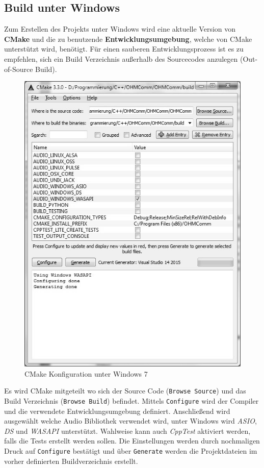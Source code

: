 \subsection{Build unter Windows}
Zum Erstellen des Projekts unter Windows wird eine aktuelle Version von \textbf{CMake} \cite{Cmake} und die zu benutzende \textbf{Entwicklungsumgebung}, welche von CMake unterstützt wird, benötigt.
Für einen sauberen Entwicklungsprozess ist es zu empfehlen, sich ein Build Verzeichnis außerhalb des Sourcecodes anzulegen (Out-of-Source Build).

\begin{figure}[htp]
\centering
\includegraphics[width=.80\textwidth]{images/CMake}
\caption{CMake Konfiguration unter Windows 7}
\label{Fig:CMake}
\end{figure}

Es wird CMake mitgeteilt wo sich der Source Code (\texttt{Browse Source}) und das Build Verzeichnis (\texttt{Browse Build}) befindet.
Mittels \texttt{Configure} wird der Compiler und die verwendete Entwicklungsumgebung definiert.
Anschließend wird ausgewählt welche Audio Bibliothek verwendet wird, unter Windows wird \textit{ASIO}, \textit{DS} und \textit{WASAPI} unterstützt. Wahlweise kann auch \textit{CppTest} aktiviert werden, falls die Tests erstellt werden sollen.
Die Einstellungen werden durch nochmaligen Druck auf \texttt{Configure} bestätigt und über \texttt{Generate} werden die Projektdateien im vorher definierten Buildverzeichnis erstellt.

